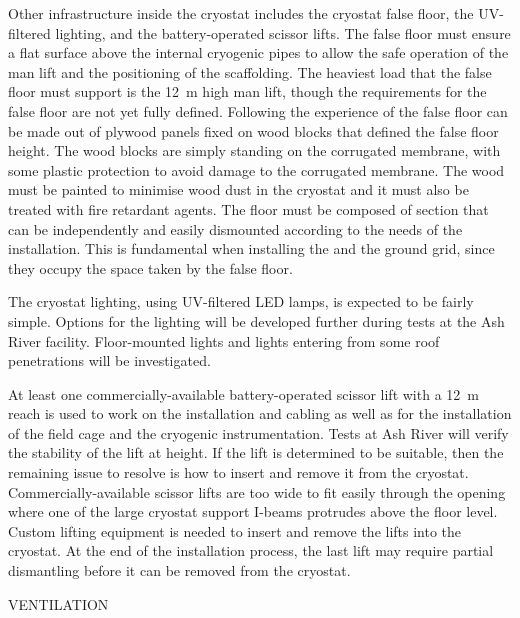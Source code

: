 Other infrastructure inside the cryostat includes the cryostat false floor, the UV-filtered lighting, and the battery-operated scissor lifts.
The false floor must ensure a flat surface above the internal cryogenic pipes to allow the safe operation of the man lift and the positioning of the scaffolding.
The heaviest load that the false floor must support is the 12~m high man lift, though the requirements for the false floor are not yet fully defined.
Following the experience of  the false floor can be made out of plywood panels fixed on wood blocks that defined the false floor height.
The wood blocks are simply standing on the corrugated membrane, with some plastic protection to avoid damage to the corrugated membrane.
The wood must be painted to minimise wood dust in the cryostat and it must also be treated with fire retardant agents.
The floor must be composed of section that can be independently and easily dismounted according to the needs of the installation.
This is fundamental when installing the  and the ground grid, since they occupy the space taken by the false floor.

The cryostat lighting, using UV-filtered LED lamps, is expected to be fairly simple.
Options for the lighting will be developed further during tests at the Ash River facility.
Floor-mounted lights and lights entering from some roof penetrations will be investigated.

At least one commercially-available battery-operated scissor lift with a 12~m reach is used to work on the  installation and cabling as well as for the installation of the field cage and the cryogenic instrumentation.
Tests at Ash River will verify the stability of the lift at height.
If the lift is determined to be suitable, then the remaining issue to resolve is how to insert and remove it from the cryostat.
Commercially-available scissor lifts are too wide to fit easily through the  opening where one of the large cryostat support I-beams protrudes above the floor level.
Custom lifting equipment is needed to insert and remove the lifts into the cryostat.
At the end of the installation process, the last lift may require partial dismantling before it can be removed from the cryostat.

VENTILATION


